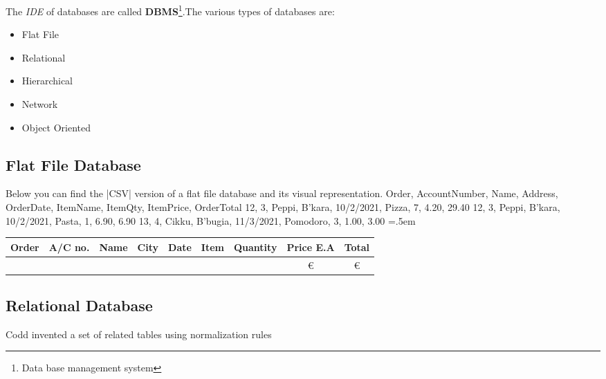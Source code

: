 \documentclass{article}
\newenvironment{lcverbatim}
{\SaveVerbatim{cverb}}
{\endSaveVerbatim
	\flushleft\fboxrule=0pt\fboxsep=.5em
	\colorbox{cverbbg}{%
		\makebox[\dimexpr\linewidth-2\fboxsep][l]{\BUseVerbatim{cverb}}%
	}
	\endflushleft
}
\begin{document}
		The \textit{IDE} of databases are called \textbf{DBMS}\footnote{Data base management system}.The various types of databases are: 
		\begin{itemize}
			\item{Flat File}
			\item{Relational}
			\item{Hierarchical}
			\item{Network}
			\item{Object Oriented}
		\end{itemize}
	\subsection{Flat File Database}
	Below you can find the \cverb|CSV| version of a flat file database and its visual representation.
\begin{lcverbatim}
Order, AccountNumber, Name, Address, OrderDate, ItemName, ItemQty, ItemPrice, OrderTotal
12, 3, Peppi, B'kara, 10/2/2021, Pizza, 7, 4.20, 29.40
12, 3, Peppi, B'kara, 10/2/2021, Pasta, 1, 6.90, 6.90 
13, 4, Cikku, B'bugia, 11/3/2021, Pomodoro, 3, 1.00, 3.00
\end{lcverbatim}
\begin{center}
		\begin{tabular}{|c|c|c|c|c|c|c|c|c|}%
		\hline
		\bfseries Order & \bfseries A/C no. & \bfseries Name &\bfseries City &\bfseries Date & \bfseries Item &\bfseries Quantity &\bfseries Price E.A &\bfseries Total 
		\csvreader[head to column names]{flat_file.csv}{}%
		{\\\hline\Order & \AccountNumber &  \Name & \Address & \OrderDate & \ItemName & \ItemQty & \euro\ItemPrice & \euro\OrderTotal}
		\\\hline
	\end{tabular}
\end{center}
	
	\subsection{Relational Database}
		Codd invented a set of related tables using normalization rules
\end{document}

